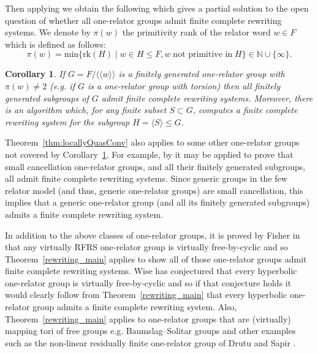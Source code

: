 \documentclass[12pt, a4paper]{amsart}
\newtheorem{corollary}[theorem]{Corollary}
\theoremstyle{definition}
\newcommand{\normal}[1]{\langle\!\langle #1 \rangle\!\rangle}
\begin{document}
Then applying \cite[Theorem 1.4]{linton2025geometry} we obtain the following which gives a partial solution to the open question of whether all one-relator groups admit finite complete rewriting systems. We denote by $\pi(w)$ the primitivity rank of the relator word $w \in F$ which is defined as follows:    
\[
\pi(w) = \mathrm{min}\{
\mathrm{rk}(H) \mid 
w \in H \leq F, w \; \mbox{not primitive in} \; H \} \in \mathbb{N} \cup \{ \infty \}. 
\]

\begin{corollary}\label{cor:PrimRank}
If $G = F/\normal{w}$ is a finitely generated one-relator group with $\pi(w)\neq 2$ (e.g. if $G$ is a one-relator group with torsion) then all finitely generated subgroups of $G$ admit finite complete rewriting systems. Moreover, there is an algorithm which, for any finite subset $S\subset G$, computes a finite complete rewriting system for the subgroup $H = \langle S\rangle\leqslant G$.
\end{corollary}

Theorem~\ref{thm:locallyQuasConv} also applies to some other one-relator groups not covered by Corollary~\ref{cor:PrimRank}. 
For example, by\cite[Corollary 1.5]{KL24b}  it may be applied to prove that small cancellation one-relator groups, and all their finitely generated subgroups, all admit finite complete rewriting systems. Since generic groups in the few relator model (and thus, generic one-relator groups) are small cancellation, this implies that a generic one-relator group (and all its finitely generated subgroups) admits a finite complete rewriting system.

In addition to the above classes of one-relator groups, it is proved by Fisher in \cite{fisher2026cohomological}  that any virtually RFRS one-relator group is virtually free-by-cyclic and so Theorem~\ref{rewriting_main} applies to show all of those one-relator groups admit finite complete rewriting systems. Wise \cite[Conjecture 17.8]{WiseWhatsNext} has conjectured that every hyperbolic one-relator group is virtually free‑by‑cyclic and so if that conjecture holds it would clearly follow from Theorem~\ref{rewriting_main} that every hyperbolic one-relator group admits a finite complete rewriting system.
Also, Theorem~\ref{rewriting_main} applies to one-relator groups that are (virtually) mapping tori of free groups e.g. Baumslag--Solitar groups and other examples such as the non-linear residually finite one-relator group of Drutu and Sapir \cite{DrutuSapir2005}.  
 
\end{document}
